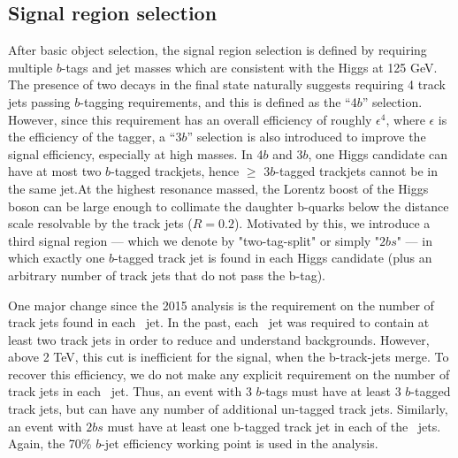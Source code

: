 \subsection{Signal region selection}
After basic object selection, the signal region selection is defined by requiring multiple $b$-tags and jet masses which are consistent with the Higgs at 125 GeV. The presence of two \hbb decays in the final state naturally suggests requiring 4 track jets passing $b$-tagging requirements, and this is defined as the ``4$b$'' selection. However, since this requirement has an overall efficiency of roughly $\epsilon^4$, where $\epsilon$ is the efficiency of the tagger, a ``3$b$'' selection is also introduced to improve the signal efficiency, especially at high masses. In 4$b$ and 3$b$, one Higgs candidate can have at most two $b$-tagged trackjets, hence $\geq$ 3$b$-tagged trackjets cannot be in the same \largeR jet.At the highest resonance massed, the Lorentz boost of the Higgs boson can be large enough to collimate the daughter b-quarks below the distance scale resolvable by the track jets ($R=0.2$). Motivated by this, we introduce a third signal region --- which we denote by "two-tag-split" or simply  "$2bs$" --- in which exactly one $b$-tagged track jet is found in each Higgs candidate (plus an arbitrary number of track jets that do not pass the b-tag).

One major change since the 2015 analysis is the requirement on the number of track jets found in each \largeR\ jet.  In the past, each \largeR\ jet was required to contain at least two track jets in order to reduce and understand backgrounds.  However, above 2 TeV, this cut is inefficient for the signal, when the b-track-jets merge.  To recover this efficiency, we do not make any explicit requirement on the number of track jets in each \largeR\ jet.  Thus, an event with 3 $b$-tags must have at least 3 $b$-tagged track jets, but can have any number of additional un-tagged track jets. Similarly, an event with $2bs$ must have at least one b-tagged track jet in each of the \largeR\ jets. Again, the 70\% $b$-jet efficiency working point is used in the analysis.

